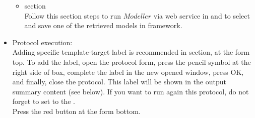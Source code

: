 \begin{itemize}
\begin{itemize}
  \item {} section\\
  
  Follow this section steps to run $Modeller$ via web service in \chimera and to select and save one of the retrieved models in \scipion framework.\\
  
  \end{itemize}
  \item Protocol execution:\\
  
  Adding specific template-target label is recommended in  section, at the form top. To add the label, open the protocol form, press the pencil symbol at the right side of  box, complete the label in the new opened window, press OK, and finally, close the protocol. This label will be shown in the output summary content (see below). If you want to run again this protocol, do not forget to set to  the .\\
  Press the  red button at the form bottom.\\
  

\end{itemize}
